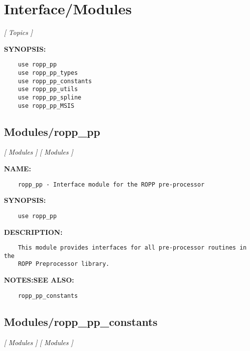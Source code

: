 \section{Interface/Modules}
\textsl{[ Topics ]}

\label{ch:robo24}
\label{ch:Interface_Modules}
\textbf{SYNOPSIS:}\hspace{0.08in}\begin{Verbatim}
    use ropp_pp
    use ropp_pp_types
    use ropp_pp_constants
    use ropp_pp_utils
    use ropp_pp_spline
    use ropp_pp_MSIS
\end{Verbatim}
\subsection{Modules/ropp\_pp}
\textsl{[ Modules ]}
\textsl{[ Modules ]}

\label{ch:robo42}
\label{ch:Modules_ropp_pp}
\textbf{NAME:}\hspace{0.08in}\begin{Verbatim}
    ropp_pp - Interface module for the ROPP pre-processor
\end{Verbatim}
\textbf{SYNOPSIS:}\hspace{0.08in}\begin{Verbatim}
    use ropp_pp
\end{Verbatim}
\textbf{DESCRIPTION:}\hspace{0.08in}\begin{Verbatim}
    This module provides interfaces for all pre-processor routines in the
    ROPP Preprocessor library.
\end{Verbatim}
\textbf{NOTES:}\hspace{0.08in}\textbf{SEE ALSO:}\hspace{0.08in}\begin{Verbatim}
    ropp_pp_constants
\end{Verbatim}
\subsection{Modules/ropp\_pp\_constants}
\textsl{[ Modules ]}
\textsl{[ Modules ]}

